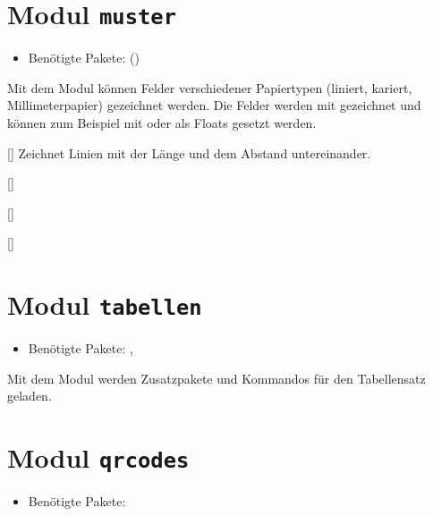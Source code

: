 \section{Modul \texttt{muster}}\label{sec:modul-muster}
\begin{itemize}
	\item Benötigte Pakete: ()
\end{itemize}

Mit dem Modul  können Felder verschiedener Papiertypen (liniert,
kariert, Millimeterpapier) gezeichnet werden. Die Felder werden mit 
gezeichnet und können zum Beispiel mit  oder  als
Floats gesetzt werden.

\begin{commands}
	[\sarg{}]
	Zeichnet  Linien mit der Länge  und dem
	Abstand  untereinander.

	[\sarg{}]

	[\sarg{}]

	[\sarg{}]
\end{commands}
\begin{example}
\end{example}
\begin{example}
	\begin{center}
	\end{center}
\end{example}
\begin{example}
\end{example}

\section{Modul \texttt{tabellen}}\label{sec:modul-tabellen}
\begin{itemize}
	\item Benötigte Pakete: , 
\end{itemize}

Mit dem Modul  werden Zusatzpakete und Kommandos für den
Tabellensatz geladen.

\section{Modul \texttt{qrcodes}}\label{sec:modul-qrcodes}
\begin{itemize}
	\item Benötigte Pakete: 
\end{itemize}

